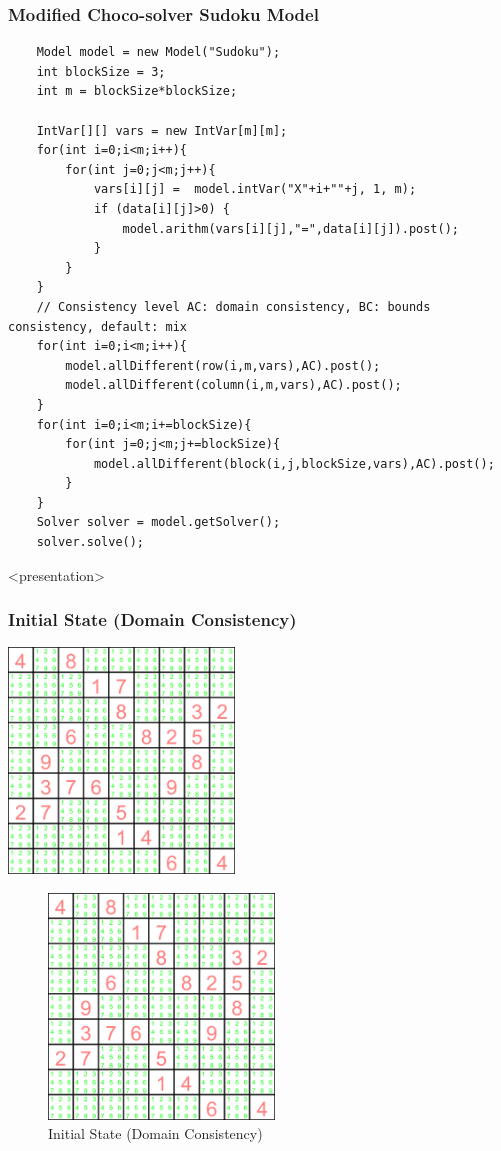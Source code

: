 \begin{frame}[fragile]
\frametitle{Modified Choco-solver Sudoku Model}
\label{sudoku:choco mod}
\tiny
\begin{verbatim}
    Model model = new Model("Sudoku");
    int blockSize = 3;
    int m = blockSize*blockSize;

    IntVar[][] vars = new IntVar[m][m];
    for(int i=0;i<m;i++){
        for(int j=0;j<m;j++){
            vars[i][j] =  model.intVar("X"+i+""+j, 1, m);
            if (data[i][j]>0) {
                model.arithm(vars[i][j],"=",data[i][j]).post();
            }
        }
    }
	// Consistency level AC: domain consistency, BC: bounds consistency, default: mix
    for(int i=0;i<m;i++){
        model.allDifferent(row(i,m,vars),AC).post();
        model.allDifferent(column(i,m,vars),AC).post();
    }
    for(int i=0;i<m;i+=blockSize){
        for(int j=0;j<m;j+=blockSize){
            model.allDifferent(block(i,j,blockSize,vars),AC).post();
        }
    }
    Solver solver = model.getSolver();
    solver.solve();
\end{verbatim}
\end{frame}


\begin{frame}<presentation>
\frametitle{Initial State (Domain Consistency)}
\includegraphics[width=6cm]{../sudoku/DC/frame1}
\end{frame}

\begin{figure}[ht]
\caption{\label{sudoku:initialstatedc}Initial State (Domain Consistency)}
\begin{center}
\includegraphics[width=6cm]{../sudoku/DC/frame1}
\end{center}
\end{figure}



